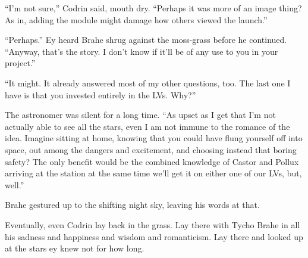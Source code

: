 ``I'm not sure,'' Codrin said, mouth dry. ``Perhaps it was more of an image thing? As in, adding the module might damage how others viewed the launch.''

``Perhaps.'' Ey heard Brahe shrug against the moss-grass before he continued. ``Anyway, that's the story. I don't know if it'll be of any use to you in your project.''

``It might. It already answered most of my other questions, too. The last one I have is that you invested entirely in the LVs. Why?''

The astronomer was silent for a long time. ``As upset as I get that I'm not actually able to see all the stars, even I am not immune to the romance of the idea. Imagine sitting at home, knowing that you could have flung yourself off into space, out among the dangers and excitement, and choosing instead that boring safety? The only benefit would be the combined knowledge of Castor and Pollux arriving at the station at the same time we'll get it on either one of our LVs, but, well.''

Brahe gestured up to the shifting night sky, leaving his words at that.

Eventually, even Codrin lay back in the grass. Lay there with Tycho Brahe in all his sadness and happiness and wisdom and romanticism. Lay there and looked up at the stars ey knew not for how long.
